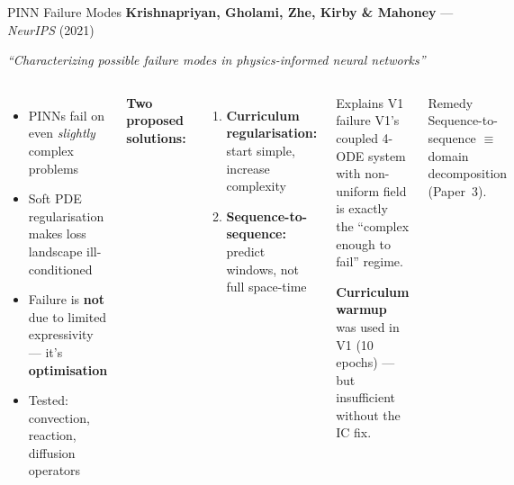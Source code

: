 \documentclass[aspectratio=169, 11pt]{beamer}
\begin{document}
\begin{frame}{PINN Failure Modes}
  \textbf{Krishnapriyan, Gholami, Zhe, Kirby \& Mahoney} --- \textit{NeurIPS} (2021)

  \textit{``Characterizing possible failure modes in physics-informed neural networks''}

  \begin{columns}[T]
    \begin{itemize}
      \item PINNs fail on even \emph{slightly} complex problems
      \item Soft PDE regularisation makes loss landscape ill-conditioned
      \item Failure is \textbf{not} due to limited expressivity --- it's \textbf{optimisation}
      \item Tested: convection, reaction, diffusion operators
    \end{itemize}

    \textbf{Two proposed solutions:}
    \begin{enumerate}
      \item \textbf{Curriculum regularisation:} start simple, increase complexity
      \item \textbf{Sequence-to-sequence:} predict windows, not full space-time
    \end{enumerate}

    \begin{alertblock}{Explains V1 failure}
      V1's coupled 4-ODE system with non-uniform field is exactly the ``complex enough to fail'' regime.

      \medskip
      \textbf{Curriculum warmup} was used in V1 (10 epochs) --- but insufficient without the IC fix.
    \end{alertblock}

    \begin{exampleblock}{Remedy}
      Sequence-to-sequence $\equiv$ domain decomposition (Paper~3).
    \end{exampleblock}
  \end{columns}
\end{frame}
\end{document}
